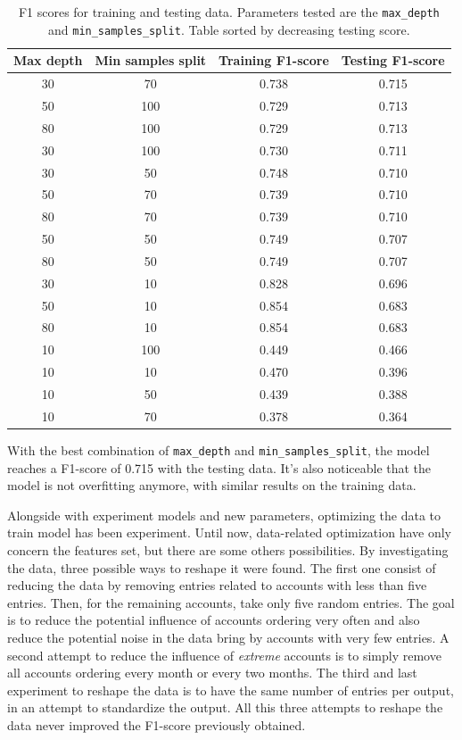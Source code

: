 \begin{table}[!htbp]
    \centering
    \begin{tabular}{c|c|c|c}
    \textbf{Max depth} & \textbf{Min samples split} & \textbf{Training F1-score} & \textbf{Testing F1-score} \\ \hline
    30	&  70   &  	0.738  &  0.715 \\
    50	&  100  &  	0.729  &  0.713 \\
    80	&  100  &  	0.729  &  0.713 \\
    30	&  100  &  	0.730  &  0.711 \\
    30	&  50   &  	0.748  &  0.710 \\
    50	&  70   &  	0.739  &  0.710 \\
    80	&  70   &  	0.739  &  0.710 \\
    50	&  50   &  	0.749  &  0.707 \\
    80	&  50   &  	0.749  &  0.707 \\
    30	&  10   &  	0.828  &  0.696 \\
    50	&  10   &  	0.854  &  0.683 \\
    80	&  10   &  	0.854  &  0.683 \\
    10	&  100  &  	0.449  &  0.466 \\
    10	&  10   &  	0.470  &  0.396 \\
    10	&  50   &  	0.439  &  0.388 \\
    10	&  70   &  	0.378  &  0.364 
    \end{tabular}
    \caption{F1 scores for training and testing data. Parameters tested are the \texttt{max\_depth} and \texttt{min\_samples\_split}. Table sorted by decreasing testing score.}
    \label{tab:tree-fine-tune}
\end{table}

With the best combination of \texttt{max\_depth} and \texttt{min\_samples\_split}, the model reaches a F1-score of 0.715 with the testing data. It's also noticeable that the model is not overfitting anymore, with similar results on the training data.


Alongside with experiment models and new parameters, optimizing the data to train model has been experiment. Until now, data-related optimization have only concern the features set, but there are some others possibilities. By investigating the data, three possible ways to reshape it were found. 
The first one consist of reducing the data by removing entries related to accounts with less than five entries. Then, for the remaining accounts, take only five random entries. The goal is to reduce the potential influence of accounts ordering very often and also reduce the potential noise in the data bring by accounts with very few entries. A second attempt to reduce the influence of \textit{extreme} accounts is to simply remove all accounts ordering every month or every two months. The third and last experiment to reshape the data is to have the same number of entries per output, in an attempt to standardize the output. All this three attempts to reshape the data never improved the F1-score previously obtained.

